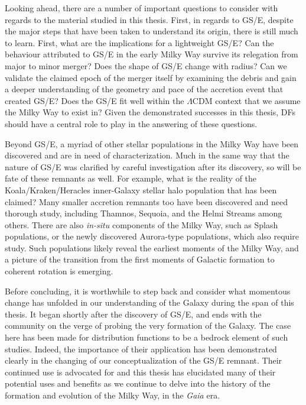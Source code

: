 Looking ahead, there are a number of important questions to consider with regards to the material studied in this thesis. First, in regards to GS/E, despite the major steps that have been taken to understand its origin, there is still much to learn. First, what are the implications for a lightweight GS/E? Can the behaviour attributed to GS/E in the early Milky Way survive its relegation from major to minor merger? Does the shape of GS/E change with radius? Can we validate the claimed epoch of the merger itself by examining the debris and gain a deeper understanding of the geometry and pace of the accretion event that created GS/E? Does the GS/E fit well within the $\Lambda$CDM context that we assume the Milky Way to exist in? Given the demonstrated successes in this thesis, DFs should have a central role to play in the answering of these questions.

Beyond GS/E, a myriad of other stellar populations in the Milky Way have been discovered and are in need of characterization. Much in the same way that the nature of GS/E was clarified by careful investigation after its discovery, so will be fate of these remnants as well. For example, what is the reality of the Koala/Kraken/Heracles inner-Galaxy stellar halo population that has been claimed? Many smaller accretion remnants too have been discovered and need thorough study, including Thamnos, Sequoia, and the Helmi Streams among others. There are also \textit{in-situ} components of the Milky Way, such as Splash populations, or the newly discovered Aurora-type populations, which also require study. Such populations likely reveal the earliest moments of the Milky Way, and a picture of the transition from the first moments of Galactic formation to coherent rotation is emerging.

Before concluding, it is worthwhile to step back and consider what momentous change has unfolded in our understanding of the Galaxy during the span of this thesis. It began shortly after the discovery of GS/E, and ends with the community on the verge of probing the very formation of the Galaxy. The case here has been made for distribution functions to be a bedrock element of such studies. Indeed, the importance of their application has been demonstrated clearly in the changing of our conceptualization of the GS/E remnant. Their continued use is advocated for and this thesis has elucidated many of their potential uses and benefits as we continue to delve into the history of the formation and evolution of the Milky Way, in the \textit{Gaia} era.